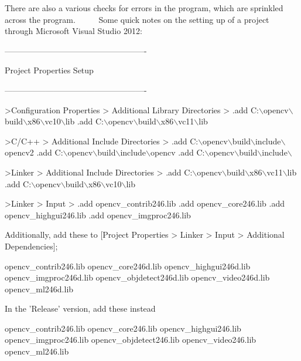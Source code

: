 There are also a various checks for errors in the program, which are sprinkled across the program. ~\newline
~\newline
~\newline
 Some quick notes on the setting up of a project through Microsoft Visual Studio 2012\+: 
\begin{DoxyCode}
 ----------------------------------------------------

    Project Properties Setup

 ----------------------------------------------------

>Configuration Properties > Additional Library Directories > 
    .add C:\(\backslash\)opencv\(\backslash\)build\(\backslash\)x86\(\backslash\)vc10\(\backslash\)lib
    .add C:\(\backslash\)opencv\(\backslash\)build\(\backslash\)x86\(\backslash\)vc11\(\backslash\)lib

>C/C++ > Additional Include Directories >
    .add C:\(\backslash\)opencv\(\backslash\)build\(\backslash\)include\(\backslash\)opencv2
    .add C:\(\backslash\)opencv\(\backslash\)build\(\backslash\)include\(\backslash\)opencv
    .add C:\(\backslash\)opencv\(\backslash\)build\(\backslash\)include\(\backslash\)

>Linker > Additional Include Directories >
    .add C:\(\backslash\)opencv\(\backslash\)build\(\backslash\)x86\(\backslash\)vc11\(\backslash\)lib
    .add C:\(\backslash\)opencv\(\backslash\)build\(\backslash\)x86\(\backslash\)vc10\(\backslash\)lib

>Linker > Input >
    .add opencv\_contrib246.lib
    .add opencv\_core246.lib
    .add opencv\_highgui246.lib
    .add opencv\_imgproc246.lib


    Additionally, add these to [Project Properties > Linker > Input > Additional Dependencies];

            opencv\_contrib246.lib
            opencv\_core246d.lib
            opencv\_highgui246d.lib
            opencv\_imgproc246d.lib
            opencv\_objdetect246d.lib
            opencv\_video246d.lib
            opencv\_ml246d.lib

    In the \textcolor{stringliteral}{'Release'} version, add these instead

            opencv\_contrib246.lib
            opencv\_core246.lib
            opencv\_highgui246.lib
            opencv\_imgproc246.lib
            opencv\_objdetect246.lib
            opencv\_video246.lib
            opencv\_ml246.lib



\end{DoxyCode}
